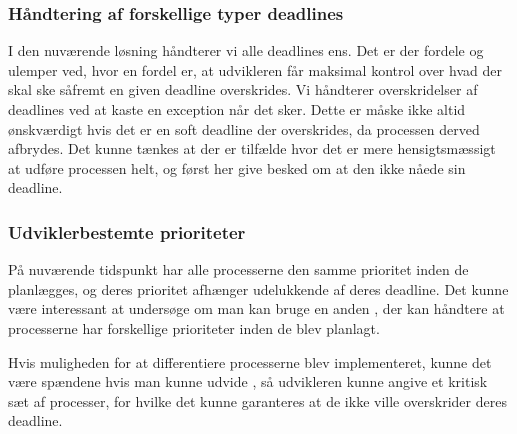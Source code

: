 \subsubsection{Håndtering af forskellige typer deadlines}
I den nuværende løsning håndterer vi alle deadlines ens. Det er der fordele og ulemper ved, hvor en fordel er, at udvikleren får maksimal kontrol over hvad der skal ske såfremt en given deadline overskrides. Vi håndterer overskridelser af deadlines ved at kaste en exception når det sker. Dette er måske ikke altid ønskværdigt hvis det er en soft deadline der overskrides, da processen derved afbrydes. Det kunne tænkes at der er tilfælde hvor det er mere hensigtsmæssigt at udføre processen helt, og først her give besked om at den ikke nåede sin deadline.



\subsubsection{Udviklerbestemte prioriteter}
På nuværende tidspunkt har alle processerne den samme prioritet inden de planlægges, og deres prioritet afhænger udelukkende af deres deadline. Det kunne være interessant at undersøge om man kan bruge en anden \sched, der kan håndtere at processerne har forskellige prioriteter inden de blev planlagt.

Hvis muligheden  for at differentiere processerne blev implementeret, kunne det være spændene hvis man kunne udvide \sched, så udvikleren kunne angive et kritisk sæt af processer, for hvilke det kunne garanteres at de ikke ville overskrider deres deadline. 






